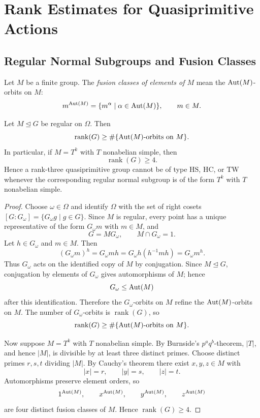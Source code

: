 \chapter{Rank Estimates for Quasiprimitive Actions}

\providecommand{\rank}{\operatorname{rank}}
\providecommand{\Soc}{\operatorname{Soc}}
\providecommand{\Sym}{\operatorname{Sym}}
\providecommand{\Inn}{\operatorname{Inn}}
\providecommand{\Out}{\operatorname{Out}}
\providecommand{\wt}{\operatorname{wt}}
\providecommand{\Diag}{\operatorname{Diag}}


\section{Regular Normal Subgroups and Fusion Classes}

\begin{definition}
Let $M$ be a finite group.  The \emph{fusion classes of elements of $M$} mean the
$\operatorname{Aut}(M)$-orbits on $M$:
\[
    m^{\operatorname{Aut}(M)}=\{m^\alpha\mid \alpha\in \operatorname{Aut}(M)\},\qquad m\in M.
\]
\end{definition}

\begin{lemma}\label{lem:regular-normal-fusion}
Let $M\unlhd G$ be regular on $\Omega$.  Then
\[
    \rank(G)\geq \#\{\Aut(M)\text{-orbits on }M\}.
\]
In particular, if $M=T^k$ with $T$ nonabelian simple, then
\[
    \rank(G)\geq 4.
\]
Hence a rank-three quasiprimitive group cannot be of type $\mathrm{HS}$, $\mathrm{HC}$, or $\mathrm{TW}$ whenever the corresponding regular normal subgroup is of the form $T^k$ with $T$ nonabelian simple.
\end{lemma}

\begin{proof}
Choose $\omega\in\Omega$ and identify $\Omega$ with the set of right cosets
$[G:G_\omega]=\{G_\omega g\mid g\in G\}$.  Since $M$ is regular, every point has a unique representative of the form $G_\omega m$ with $m\in M$, and
\[
    G=MG_\omega,\qquad M\cap G_\omega=1.
\]
Let $h\in G_\omega$ and $m\in M$.  Then
\[
    (G_\omega m)^h=G_\omega mh
    =G_\omega h(h^{-1}mh)
    =G_\omega m^h.
\]
Thus $G_\omega$ acts on the identified copy of $M$ by conjugation.  Since $M\unlhd G$, conjugation by elements of $G_\omega$ gives automorphisms of $M$; hence
\[
    G_\omega \leq \operatorname{Aut}(M)
\]
after this identification.  Therefore the $G_\omega$-orbits on $M$ refine the $\operatorname{Aut}(M)$-orbits on $M$.  The number of $G_\omega$-orbits is $\rank(G)$, so
\[
    \rank(G)\geq \#\{\Aut(M)\text{-orbits on }M\}.
\]

Now suppose $M=T^k$ with $T$ nonabelian simple.  By Burnside's $p^aq^b$-theorem, $|T|$, and hence $|M|$, is divisible by at least three distinct primes.  Choose distinct primes $r,s,t$ dividing $|M|$.  By Cauchy's theorem there exist $x,y,z\in M$ with
\[
    |x|=r,\qquad |y|=s,\qquad |z|=t.
\]
Automorphisms preserve element orders, so
\[
    1^{\operatorname{Aut}(M)},\qquad x^{\operatorname{Aut}(M)},\qquad y^{\operatorname{Aut}(M)},\qquad z^{\operatorname{Aut}(M)}
\]
are four distinct fusion classes of $M$.  Hence $\rank(G)\geq 4$.
\end{proof}

